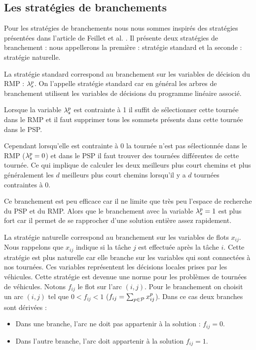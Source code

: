 \subsection{Les stratégies de branchements}

Pour les stratégies de branchements nous nous sommes inspirés des stratégies présentées dans l'article de Feillet et al. \cite{feillet2010}.
Il présente deux stratégies de branchement : nous appellerons la première : stratégie standard et la seconde : stratégie naturelle.

La stratégie standard correspond au branchement sur les variables de décision du RMP : $\lambda_{s}^{p}$.
On l'appelle stratégie standard car en général les arbres de branchement utilisent les variables de décisions du programme linéaire associé.

Lorsque la variable $\lambda_{s}^{p}$ est contrainte à 1 il suffit de sélectionner cette tournée dans le RMP et il faut supprimer tous les sommets présents dans cette tournée dans le PSP.

Cependant lorsqu'elle est contrainte à 0 la tournée n'est pas sélectionnée dans le RMP ($\lambda_{s}^{p}=0$) et dans le PSP il faut trouver des tournées différentes de cette tournée.
Ce qui implique de calculer les deux meilleurs plus court chemins et plus généralement les $d$ meilleurs plus court chemins lorsqu'il y a $d$ tournées contraintes à 0.

Ce branchement est peu efficace car il ne limite que très peu l'espace de recherche du PSP et du RMP. 
Alors que le branchement avec la variable $\lambda_{s}^{p}=1$ est plus fort car il permet de se rapprocher d'une solution entière assez rapidement.

La stratégie naturelle correspond au branchement sur les variables de flots $x_{ij}$.
Nous rappelons que $x_{ij}$ indique si la tâche $j$ est effectuée après la tâche $i$.
Cette stratégie est plus naturelle car elle branche sur les variables qui sont connectées à nos tournées.
Ces variables représentent les décisions locales prises par les véhicules.
Cette stratégie est devenue une norme pour les problèmes de tournées de véhicules.
Notons $f_{ij}$ le flot sur l'arc $(i,j)$.
Pour le branchement on choisit un arc $(i,j)$ tel que $0<f_{ij}<1$ ($f_{ij}=\sum_{p \in \mathcal{P}} x_{ij}^p$).
Dans ce cas deux branches sont dérivées :
\begin{itemize}
\item Dans une branche, l'arc ne doit pas appartenir à la solution : $f_{ij}=0$.
\item Dans l'autre branche, l'arc doit appartenir à la solution $f_{ij}=1$.
\end{itemize}

